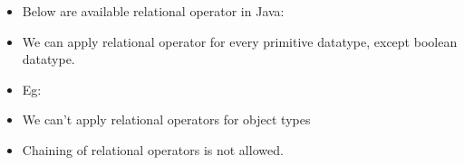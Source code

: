 
\begin{flushleft}
	
	\begin{itemize}
		\item Below are available relational operator in Java:
		\item We can apply relational operator for every primitive datatype, except boolean datatype.
		\item Eg:
		\bigskip
	
		\item We can’t apply relational operators for object types
		\bigskip
	
		\item Chaining of relational operators is not allowed.
		\bigskip
		
	\end{itemize}
	
\end{flushleft}
\newpage
